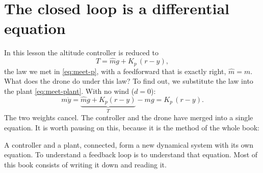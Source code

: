 \label{les:spring}


\section{The closed loop is a differential equation}

In this lesson the altitude controller is reduced to
\begin{equation}\label{eq:spring-law}
  T = \hat m g + K_p\,(r - y),
\end{equation}
the law we met in \cref{eq:meet-p}, with a feedforward that is exactly right, $\hat m = m$. What does the drone do under this law? To find out, we substitute the law into the plant \eqref{eq:meet-plant}. With no wind ($d = 0$):
\begin{equation}
  m\ddot y = \underbrace{\hat m g + K_p(r-y)}_{T} - mg = K_p\,(r - y).
\end{equation}
The two weights cancel. The controller and the drone have merged into a single equation. It is worth pausing on this, because it is the method of the whole book:

\begin{keyidea}
A controller and a plant, connected, form a new dynamical system with its own equation. To understand a feedback loop is to understand that equation. Most of this book consists of writing it down and reading it.
\end{keyidea}

